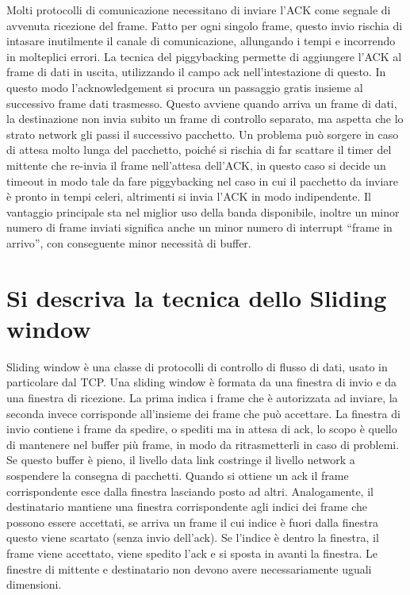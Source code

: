 Molti protocolli di comunicazione necessitano di inviare l’ACK come segnale di avvenuta ricezione del frame.
Fatto per ogni singolo frame, questo invio rischia di intasare inutilmente il canale di comunicazione, allungando i tempi e incorrendo in molteplici errori.
La tecnica del piggybacking permette di aggiungere l’ACK al frame di dati in uscita, utilizzando il campo ack nell’intestazione di questo. In questo modo l’acknowledgement si procura un passaggio gratis insieme al successivo frame dati trasmesso.
Questo avviene quando arriva un frame di dati, la destinazione non invia subito un frame di controllo separato, ma aspetta che lo strato network gli passi il successivo pacchetto.
Un problema può sorgere in caso di attesa molto lunga del pacchetto, poiché si rischia di far scattare il timer del mittente che re-invia il frame nell’attesa dell’ACK, in questo caso si decide un timeout in modo tale da fare piggybacking nel caso in cui il pacchetto da inviare è pronto in tempi celeri, altrimenti si invia l’ACK in modo indipendente.
Il vantaggio principale sta nel miglior uso della banda disponibile, inoltre un minor numero di frame inviati significa anche un minor numero di interrupt “frame in arrivo”, con conseguente minor necessità di buffer.

\section{Si descriva la tecnica dello Sliding window}

Sliding window è una classe di protocolli di controllo di flusso di dati, usato in particolare dal TCP.
Una sliding window è formata da una finestra di invio e da una finestra di ricezione. La prima indica i frame che è autorizzata ad inviare, la seconda invece corrisponde all’insieme dei frame che può accettare.
La finestra di invio contiene i frame da spedire, o spediti ma in attesa di ack, lo scopo è quello di mantenere nel buffer più frame, in modo da ritrasmetterli in caso di problemi. Se questo buffer è pieno, il livello data link costringe il livello network a sospendere la consegna di pacchetti. Quando si ottiene un ack il frame corrispondente esce dalla finestra lasciando posto ad altri.
Analogamente, il destinatario mantiene una finestra corrispondente agli indici dei frame che possono essere accettati, se arriva un frame il cui indice è fuori dalla finestra questo viene scartato (senza invio dell’ack). Se l’indice è dentro la finestra, il frame viene accettato, viene spedito l’ack e si sposta in avanti la finestra.
Le finestre di mittente e destinatario non devono avere necessariamente uguali dimensioni.

